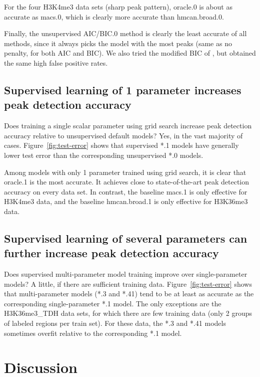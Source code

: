\documentclass{article}
\begin{document}
For the four H3K4me3 data sets (sharp peak pattern), oracle.0 is about
as accurate as macs.0, which is clearly more accurate than
hmcan.broad.0.

Finally, the unsupervised AIC/BIC.0 method is clearly the least
accurate of all methods, since it always picks the model with the most
peaks (same as no penalty, for both AIC and BIC). We also tried the
modified BIC of \citet{mBIC}, but obtained the same high false
positive rates.

\subsection{Supervised learning of 1 parameter increases peak
  detection accuracy}

Does training a single scalar parameter using grid search increase
peak detection accuracy relative to unsupervised default models? Yes,
in the vast majority of cases. Figure~\ref{fig:test-error} shows that
supervised *.1 models have generally lower test error than the
corresponding unsupervised *.0 models.

Among models with only 1 parameter trained using grid search, it is
clear that oracle.1 is the most accurate. It achieves close to
state-of-the-art peak detection accuracy on every data set. In
contrast, the baseline macs.1 is only effective for H3K4me3 data, and
the baseline \mbox{hmcan.broad.1} is only effective for H3K36me3 data.

\subsection{Supervised learning of several parameters can further
  increase peak detection accuracy}

Does supervised multi-parameter model training improve over
single-parameter models? A little, if there are sufficient training
data. Figure~\ref{fig:test-error} shows that multi-parameter models
(*.3 and *.41) tend to be at least as accurate as the corresponding
single-parameter *.1 model. The only exceptions are the H3K36me3\_TDH
data sets, for which there are few training data (only 2 groups of
labeled regions per train set). For these data, the *.3 and
*.41 models sometimes overfit relative to the corresponding *.1 model.

\section{Discussion}
\label{sec:discussion}
\end{document}
